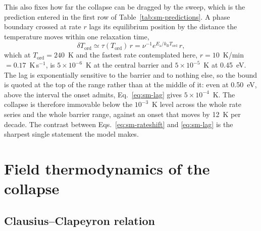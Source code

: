\documentclass[reprint,twocolumn,prb,amsmath,amssymb,superscriptaddress,floatfix]{revtex4-2}
\newcommand{\kB}{k_{\mathrm{B}}}
\newcommand{\Ea}{E_{\mathrm{a}}}
\newcommand{\Tcol}{T_{\mathrm{ord}}}
\begin{document}
This also fixes how far the collapse can be dragged by the sweep, which is the prediction entered
in the first row of Table~\ref{tab:sm-predictions}. A phase boundary crossed at rate $r$ lags its
equilibrium position by the distance the temperature moves within one relaxation time,
\begin{equation}
  \delta\Tcol \simeq \tau(\Tcol)\,r = \nu^{-1}e^{\Ea/\kB\Tcol}\,r ,
  \label{eq:sm-lag}
\end{equation}
which at $\Tcol=240$~K and the fastest rate contemplated here, $r=10$~K/min
$=0.17$~K\,s$^{-1}$, is $5\times10^{-6}$~K at the central barrier and $5\times10^{-5}$~K at
0.45~eV. The lag is exponentially sensitive to the barrier and to nothing else, so the bound is
quoted at the top of the range rather than at the middle of it: even at
0.50~eV, above the interval the onset admits, Eq.~\eqref{eq:sm-lag} gives $5\times10^{-4}$~K.
The collapse is therefore immovable below the $10^{-3}$~K level across the whole rate series and
the whole barrier range, against an onset that moves by 12~K per decade. The contrast between
Eqs.~\eqref{eq:sm-rateshift} and \eqref{eq:sm-lag} is the sharpest single statement the model
makes.

\section{Field thermodynamics of the collapse}
\label{sec:field}

\subsection{Clausius--Clapeyron relation}
\end{document}
